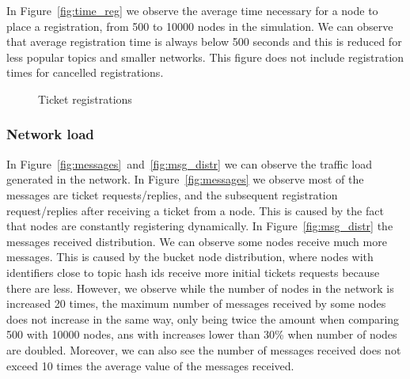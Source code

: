 In Figure~\ref{fig:time_reg} we observe the average time necessary for a node to place a registration,  from 500 to 10000 nodes in the simulation.
We can observe that average registration time is always below 500 seconds and this is reduced for less popular topics and smaller networks. 
This figure does not include registration times for cancelled registrations.

\begin{figure}[!h]
\centering
{} 
\hspace{-0.25cm}
 \caption{Ticket registrations} 
\label{fig:registrations}
\vspace{-0.15in}
\end{figure}   


\subsubsection{Network load}

In Figure~\ref{fig:messages}~and~\ref{fig:msg_distr} we can observe the traffic load generated in the network.
In Figure~\ref{fig:messages} we observe most of the messages are ticket requests/replies, and the subsequent registration request/replies
after receiving a ticket from a node. 
This is caused by the fact that nodes are constantly registering dynamically. 
In Figure~\ref{fig:msg_distr} the messages received distribution. 
We can observe some nodes receive much more messages.
This is caused by the bucket node distribution, where nodes with identifiers close to topic hash ids receive more initial tickets requests because there are less.
However, we observe while the number of nodes in the network is increased 20 times,  the  maximum number of messages received by some nodes does not increase in the same way,  only being twice the amount when comparing 500 with 10000 nodes,  ans with increases lower than 30\% when number of nodes are doubled.
Moreover,  we can also see the number of messages received does not exceed 10 times the average value of the messages received. 

